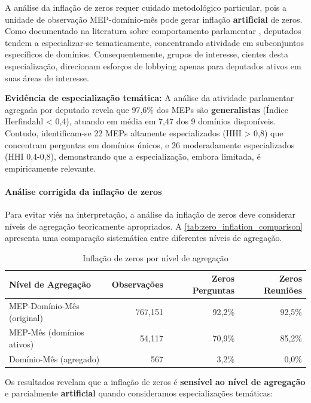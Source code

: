 A análise da inflação de zeros requer cuidado metodológico particular, pois a unidade de observação MEP-domínio-mês pode gerar inflação \textbf{artificial} de zeros. Como documentado na literatura sobre comportamento parlamentar \cite{example}, deputados tendem a especializar-se tematicamente, concentrando atividade em subconjuntos específicos de domínios. Consequentemente, grupos de interesse, cientes desta especialização, direcionam esforços de lobbying apenas para deputados ativos em suas áreas de interesse.

\textbf{Evidência de especialização temática:} A análise da atividade parlamentar agregada por deputado revela que 97,6\% dos MEPs são \textbf{generalistas} (Índice Herfindahl < 0,4), atuando em média em 7,47 dos 9 domínios disponíveis. Contudo, identificam-se 22 MEPs altamente especializados (HHI > 0,8) que concentram perguntas em domínios únicos, e 26 moderadamente especializados (HHI 0,4-0,8), demonstrando que a especialização, embora limitada, é empiricamente relevante.

\paragraph{Análise corrigida da inflação de zeros}

Para evitar viés na interpretação, a análise da inflação de zeros deve considerar níveis de agregação teoricamente apropriados. A \autoref{tab:zero_inflation_comparison} apresenta uma comparação sistemática entre diferentes níveis de agregação.

\begin{table}[htbp]
\centering
\caption{Inflação de zeros por nível de agregação}
\label{tab:zero_inflation_comparison}
\begin{tabular}{lrrr}
\toprule
\textbf{Nível de Agregação} & \textbf{Observações} & \textbf{Zeros Perguntas} & \textbf{Zeros Reuniões} \\
\midrule
MEP-Domínio-Mês (original) & 767{,}151 & 92{,}2\% & 92{,}5\% \\
MEP-Mês (domínios ativos) & 54{,}117 & 70{,}9\% & 85{,}2\% \\
Domínio-Mês (agregado) & 567 & 3{,}2\% & 0{,}0\% \\
\bottomrule
\end{tabular}
\end{table}

Os resultados revelam que a inflação de zeros é \textbf{sensível ao nível de agregação} e parcialmente \textbf{artificial} quando consideramos especializações temáticas:


